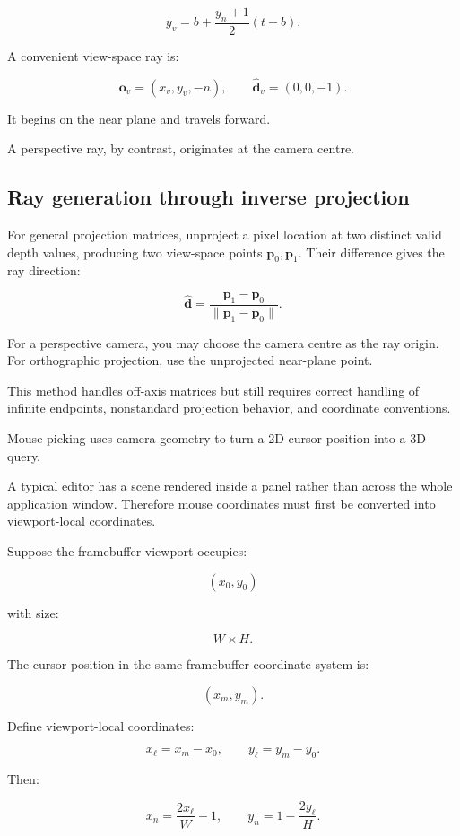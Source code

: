 \[ y_v=b+\frac{y_n+1}{2}(t-b). \]

A convenient view-space ray is:

\[ \boxed{ \mathbf o_v=(x_v,y_v,-n), \qquad \hat{\mathbf d}_v=(0,0,-1). } \]

It begins on the near plane and travels forward.

A perspective ray, by contrast, originates at the camera centre.

\subsection{Ray generation through inverse projection}\label{02-foundations-ii-ch035-ray-generation-through-inverse-projection}

For general projection matrices, unproject a pixel location at two distinct valid depth values, producing two view-space points \(\mathbf p_0,\mathbf p_1\). Their difference gives the ray direction:

\[ \boxed{ \hat{\mathbf d}= \frac{\mathbf p_1-\mathbf p_0} {\|\mathbf p_1-\mathbf p_0\|}. } \]

For a perspective camera, you may choose the camera centre as the ray origin. For orthographic projection, use the unprojected near-plane point.

This method handles off-axis matrices but still requires correct handling of infinite endpoints, nonstandard projection behavior, and coordinate conventions.

Mouse picking uses camera geometry to turn a 2D cursor position into a 3D query.

A typical editor has a scene rendered inside a panel rather than across the whole application window. Therefore mouse coordinates must first be converted into viewport-local coordinates.

Suppose the framebuffer viewport occupies:

\[ (x_0,y_0) \]

with size:

\[ W\times H. \]

The cursor position in the same framebuffer coordinate system is:

\[ (x_m,y_m). \]

Define viewport-local coordinates:

\[ \boxed{ x_\ell=x_m-x_0, \qquad y_\ell=y_m-y_0. } \]

Then:

\[ \boxed{ x_n=\frac{2x_\ell}{W}-1, \qquad y_n=1-\frac{2y_\ell}{H}. } \]

